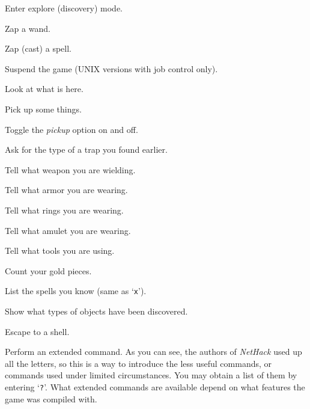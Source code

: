 Enter explore (discovery) mode.
\item[\tb{z}]
Zap a wand.
\item[\tb{Z}]
Zap (cast) a spell.
\item[\tb{\^{}Z}]
Suspend the game (UNIX versions with job control only).
\item[\tb{:}]
Look at what is here.
\item[\tb{,}]
Pick up some things.
\item[\tb{@}]
Toggle the
{\it pickup\/} option on and off.
\item[\tb{\^{}}]
Ask for the type of a trap you found earlier.
\item[\tb{)}]
Tell what weapon you are wielding.
\item[\tb{[}]
Tell what armor you are wearing.
\item[\tb{=}]
Tell what rings you are wearing.
\item[\tb{"}]
Tell what amulet you are wearing.
\item[\tb{(}]
Tell what tools you are using.
\item[\tb{\$}]
Count your gold pieces.
\item[\tb{+}]
List the spells you know (same as `{\tt x}').
\item[\tb{$\backslash$}]
Show what types of objects have been discovered.
\item[\tb{!}]
Escape to a shell.
\item[\tb{\#}]
Perform an extended command.  As you can see, the authors of {\it NetHack\/}
used up all the letters, so this is a way to introduce the less useful
commands, or commands used under limited circumstances.  You may obtain a
list of them by entering `{\tt ?}'.  What extended commands are available
depend on what features the game was compiled with.
\elist

